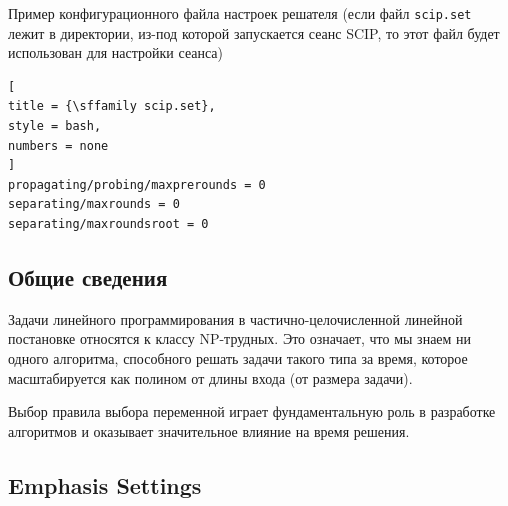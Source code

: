 \documentclass[%
	11pt,
	a4paper,
	utf8,
		]{article}
\begin{document}
Пример конфигурационного файла настроек решателя (если файл \texttt{scip.set} лежит в директории, из-под которой запускается сеанс SCIP, то этот файл будет использован для настройки сеанса)
\begin{lstlisting}[
title = {\sffamily scip.set},
style = bash,
numbers = none
]
propagating/probing/maxprerounds = 0
separating/maxrounds = 0
separating/maxroundsroot = 0
\end{lstlisting}

\subsection{Общие сведения}

Задачи линейного программирования в частично-целочисленной линейной постановке относятся к классу NP-трудных. Это означает, что мы знаем ни одного алгоритма, способного решать задачи такого типа за время, которое масштабируется как полином от длины входа (от размера задачи).

Выбор правила выбора переменной играет фундаментальную роль в разработке алгоритмов и оказывает значительное влияние на время решения.

\subsection{Emphasis Settings}
\end{document}
